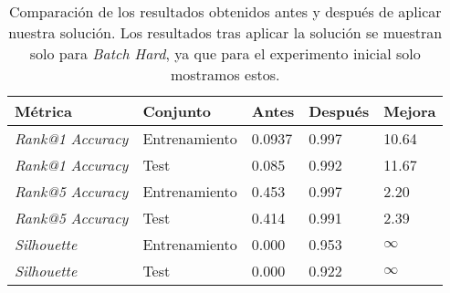 \begin{table}[!hbtp]
    \centering
    \begin{tabular}{|l|l|l|l|l|}
        \hline
        Métrica & Conjunto & Antes & Después & Mejora \\
        \hline
        \textit{Rank@1 Accuracy} & Entrenamiento & 0.0937 & 0.997 & 10.64  \\
        \textit{Rank@1 Accuracy} & Test & 0.085 & 0.992 & 11.67  \\
        \textit{Rank@5 Accuracy} & Entrenamiento & 0.453 & 0.997 & 2.20 \\
        \textit{Rank@5 Accuracy} & Test & 0.414 & 0.991 & 2.39 \\
        \textit{Silhouette} & Entrenamiento & 0.000 & 0.953 & $\infty$ \\
        \textit{Silhouette} & Test & 0.000 & 0.922 & $\infty$ \\
        \hline

    \end{tabular}
    \caption{Comparación de los resultados obtenidos antes y después de aplicar nuestra solución. Los resultados tras aplicar la solución se muestran solo para \textit{Batch Hard}, ya que para el experimento inicial solo mostramos estos.}
    \label{table:comparaciones_mnist_resultados}
\end{table}

